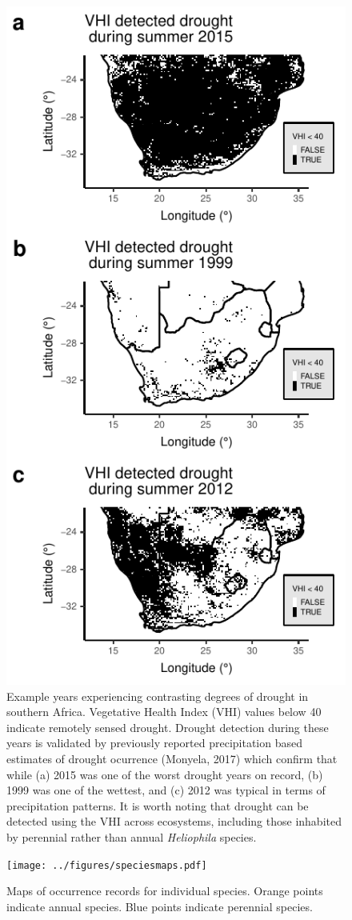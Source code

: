 \documentclass[man,floatsintext]{apa6}
\theoremstyle{definition}
\theoremstyle{definition}
\theoremstyle{definition}
\theoremstyle{remark}
\begin{document}
\begin{figure}
\centering
\includegraphics{../figures/maps_drought_examples.pdf}
\caption{\label{fig:mapsdroughtexamples}Example years experiencing contrasting degrees
of drought in southern Africa. Vegetative Health Index (VHI) values
below 40 indicate remotely sensed drought. Drought detection during
these years is validated by previously reported precipitation based
estimates of drought ocurrence (Monyela, 2017) which confirm that while
(a) 2015 was one of the worst drought years on record, (b) 1999 was one
of the wettest, and (c) 2012 was typical in terms of precipitation
patterns. It is worth noting that drought can be detected using the VHI
across ecosystems, including those inhabited by perennial rather than
annual \emph{Heliophila} species.}
\end{figure}





\begin{figure}
\centering
\texttt{[image: ../figures/speciesmaps.pdf]}
\caption{\label{fig:speciesmaps}Maps of occurrence records for individual species.
Orange points indicate annual species. Blue points indicate perennial
species.}
\end{figure}
\end{document}
